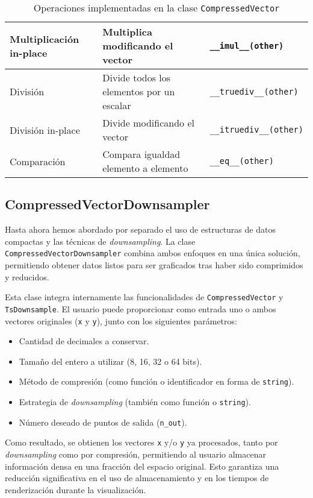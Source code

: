 \begin{table}[H]
\begin{tabular}{|p{3.5cm}|p{6cm}|p{5cm}|}
\hline
\rule{0pt}{1.5em}Multiplicación in-place & Multiplica modificando el vector         & \texttt{\_\_imul\_\_(other)} \\
\hline
\rule{0pt}{1.5em}División           & Divide todos los elementos por un escalar      & \texttt{\_\_truediv\_\_(other)} \\
\hline
\rule{0pt}{1.5em}División in-place  & Divide modificando el vector                   & \texttt{\_\_itruediv\_\_(other)} \\
\hline
\rule{0pt}{1.5em}Comparación        & Compara igualdad elemento a elemento           & \texttt{\_\_eq\_\_(other)} \\
\hline
\end{tabular}
\caption{Operaciones implementadas en la clase \texttt{CompressedVector}}
\end{table}

\subsection{CompressedVectorDownsampler}

Hasta ahora hemos abordado por separado el uso de estructuras de datos compactas y las técnicas de \textit{downsampling}. La clase \texttt{CompressedVectorDownsampler} combina ambos enfoques en una única solución, permitiendo obtener datos listos para ser graficados tras haber sido comprimidos y reducidos.

Esta clase integra internamente las funcionalidades de \texttt{CompressedVector} y \texttt{TsDownsample}. El usuario puede proporcionar como entrada uno o ambos vectores originales (\texttt{x} y \texttt{y}), junto con los siguientes parámetros:

\begin{itemize}
    \item Cantidad de decimales a conservar.
    \item Tamaño del entero a utilizar (8, 16, 32 o 64 bits).
    \item Método de compresión (como función o identificador en forma de \texttt{string}).
    \item Estrategia de \textit{downsampling} (también como función o \texttt{string}).
    \item Número deseado de puntos de salida (\texttt{n\_out}).
\end{itemize}

Como resultado, se obtienen los vectores \texttt{x} y/o \texttt{y} ya procesados, tanto por \textit{downsampling} como por compresión, permitiendo al usuario almacenar información densa en una fracción del espacio original. Esto garantiza una reducción significativa en el uso de almacenamiento y en los tiempos de renderización durante la visualización.



